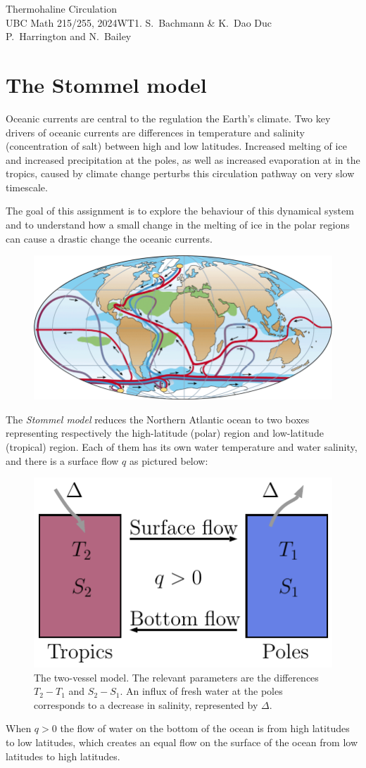 \documentclass[10pt, letterpaper, answer]{exam}
\begin{document}
\begin{center}
{\Large Thermohaline Circulation} \\ \vspace{1cm} UBC Math 215/255, 2024WT1. S.~Bachmann \& K.~Dao Duc \\
P.~Harrington and N.~Bailey
\end{center}


\section{The Stommel model}

Oceanic currents are central to the regulation the Earth's climate. Two key drivers of oceanic currents are differences in temperature and salinity (concentration of salt) between high and low latitudes. Increased melting
of ice and increased precipitation at the poles, as well as increased evaporation at in the tropics, caused by climate change perturbs this circulation pathway on very slow timescale.

The goal of this assignment is to explore the behaviour of this dynamical system and to understand how a small change in the melting of ice in the polar regions can cause a drastic change the oceanic currents. 

\begin{figure}[h]
    \centering
    \includegraphics[width=0.4\linewidth]{Simplified-sketch-of-the-global-thermohaline-circulation-pathway-whereby-yellow-dots.png}
    \label{fig:enter-label}
\end{figure}

The \emph{Stommel model} reduces the Northern Atlantic ocean to two boxes representing respectively the high-latitude (polar) region and low-latitude (tropical) region. Each of them has its own water temperature and water salinity, and there is a surface flow $q$ as pictured below:
\begin{figure}[h]
\centering
    \includegraphics[width = 0.3\linewidth]{Stommel.pdf}
    \caption{The two-vessel model. The relevant parameters are the differences $T_2 - T_1$ and $S_2 - S_1$. An influx of fresh water at the poles corresponds to a decrease in salinity, represented by $\Delta$.}
    \label{fig:enter-label}
\end{figure}
When $q>0$ the flow of water on the bottom of the ocean is from high latitudes to low latitudes, which creates an equal flow on the surface of the ocean from low latitudes to high latitudes.
\end{document}
